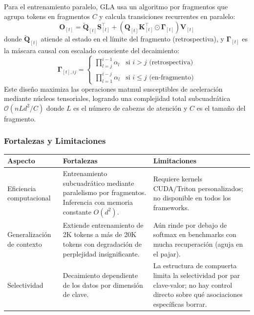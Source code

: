 \documentclass[11pt,a4paper]{article}
\begin{document}
Para el entrenamiento paralelo, GLA usa un algoritmo por fragmentos que agrupa tokens en fragmentos $C$ y calcula transiciones recurrentes en paralelo:
\[
\mathbf{O}_{[t]} = \overleftarrow{\mathbf{Q}}_{[t]} \mathbf{S}_{[t]}^\top + \left(\mathbf{Q}_{[t]} \mathbf{K}_{[t]}^\top \odot \mathbf{\Gamma}_{[t]}\right) \mathbf{V}_{[t]}
\]
donde $\overleftarrow{\mathbf{Q}}_{[t]}$ atiende al estado en el límite del fragmento (retrospectiva), y $\mathbf{\Gamma}_{[t]}$ es la máscara causal con escalado consciente del decaimiento:
\[
\mathbf{\Gamma}_{[t],ij} = \begin{cases} \prod_{l=j}^{i-1} \alpha_l & \text{si } i > j \text{ (retrospectiva)} \\ \prod_{l=1}^{i-j} \alpha_l & \text{si } i \le j \text{ (en-fragmento)} \end{cases}
\]
Este diseño maximiza las operaciones matmul susceptibles de aceleración mediante núcleos tensoriales, logrando una complejidad total subcuadrática $\mathcal{O}(nLd^2/C)$ donde $L$ es el número de cabezas de atención y $C$ es el tamaño del fragmento.

\subsubsection{Fortalezas y Limitaciones}

\begin{table}[H]
\centering
\small
\begin{tabularx}{0.95\linewidth}{Xp{4cm}p{4cm}}
\toprule
\textbf{Aspecto} & \textbf{Fortalezas} & \textbf{Limitaciones} \\
\midrule
Eficiencia computacional & Entrenamiento subcuadrático mediante paralelismo por fragmentos. Inferencia con memoria constante $O(d^2)$. & Requiere kernels CUDA/Triton personalizados; no disponible en todos los frameworks. \\
Generalización de contexto & Extiende entrenamiento de 2K tokens a más de 20K tokens con degradación de perplejidad insignificante. & Aún rinde por debajo de softmax en benchmarks con mucha recuperación (aguja en el pajar). \\
Selectividad & Decaimiento dependiente de los datos por dimensión de clave. & La estructura de compuerta limita la selectividad por par clave-valor; no hay control directo sobre qué asociaciones específicas borrar. \\
\bottomrule
\end{tabularx}
\end{table}
\end{document}
